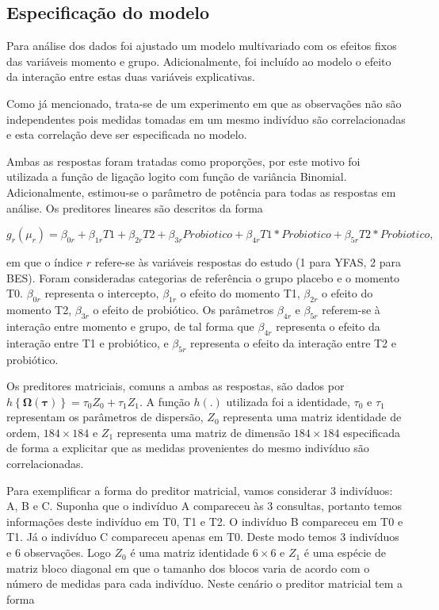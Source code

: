 
\subsection{Especificação do modelo}

Para análise dos dados foi ajustado um modelo multivariado com os efeitos fixos das variáveis momento e grupo. Adicionalmente, foi incluído ao modelo o efeito da interação entre estas duas variáveis explicativas.

Como já mencionado, trata-se de um experimento em que as observações não são independentes pois medidas tomadas em um mesmo indivíduo são correlacionadas e esta correlação deve ser especificada no modelo. 

Ambas as respostas foram tratadas como proporções, por este motivo foi utilizada a função de ligação logito com função de variância Binomial. Adicionalmente, estimou-se o parâmetro de potência para todas as respostas em análise. Os preditores lineares são descritos da forma

$$
g_{r}(\mu_{r}) = \beta_{0r} + \beta_{1r} T1 + \beta_{2r} T2 + \beta_{3r} Probiotico + \beta_{4r} T1*Probiotico + \beta_{5r} T2*Probiotico,
$$

\noindent em que o índice $r$ refere-se às variáveis respostas do estudo (1 para YFAS, 2 para BES). Foram consideradas categorias de referência o grupo placebo e o momento T0. $\beta_{0r}$ representa o intercepto, $\beta_{1r}$ o efeito do momento T1, $\beta_{2r}$ o efeito do momento T2, $\beta_{3r}$ o efeito de probiótico. Os parâmetros $\beta_{4r}$ e $\beta_{5r}$ referem-se à interação entre momento e grupo, de tal forma que $\beta_{4r}$ representa o efeito da interação entre T1 e probiótico, e $\beta_{5r}$ representa o efeito da interação entre T2 e probiótico.

Os preditores matriciais, comuns a ambas as respostas, são dados por
$h\left \{ \boldsymbol{\Omega}(\boldsymbol{\tau}) \right \} = \tau_0Z_0 + \tau_1Z_1$. A função $h(.)$ utilizada foi a identidade, $\tau_0$ e $\tau_1$ representam os parâmetros de dispersão, $Z_0$ representa uma matriz identidade de ordem, $184 \times 184$ e $Z_1$ representa uma matriz de dimensão $184 \times 184$ especificada de forma a explicitar que as medidas provenientes do mesmo indivíduo são correlacionadas. 

Para exemplificar a forma do preditor matricial, vamos considerar 3 indivíduos: A, B e C. Suponha que o indivíduo A compareceu às 3 consultas, portanto temos informações deste indivíduo em T0, T1 e T2. O indivíduo B compareceu em T0 e T1. Já o indivíduo C compareceu apenas em T0. Deste modo temos 3 indivíduos e 6 observações. Logo $Z_0$ é uma matriz identidade $6 \times 6$ e $Z_1$ é uma espécie de matriz bloco diagonal em que o tamanho dos blocos varia de acordo com o número de medidas para cada indivíduo. Neste cenário o preditor matricial tem a forma

